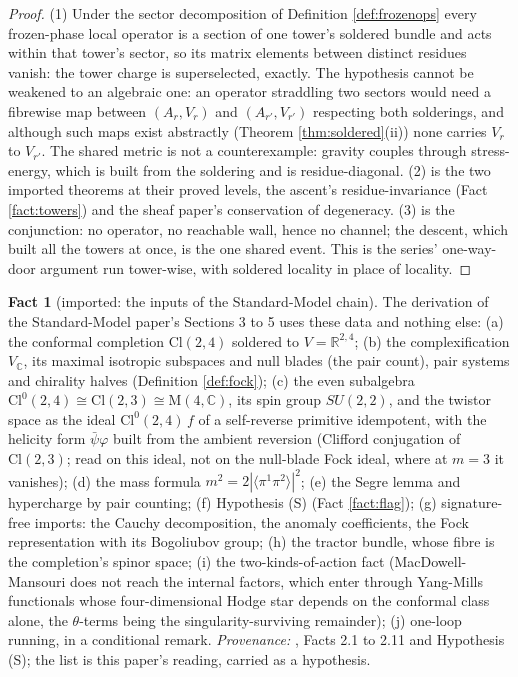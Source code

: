\documentclass[11pt]{article}
\theoremstyle{definition}
\newtheorem{fact}[theorem]{Fact}
\newcommand{\Cl}{\mathrm{Cl}}
\newcommand{\R}{\mathbb{R}}
\newcommand{\C}{\mathbb{C}}
\newcommand{\Mat}{\mathrm{M}}
\newcommand{\br}[1]{\langle #1\rangle}
\begin{document}
\begin{proof}
(1) Under the sector decomposition of Definition \ref{def:frozenops} every frozen-phase local operator is a section of one tower's soldered bundle and acts within that tower's sector, so its matrix elements between distinct residues vanish: the tower charge is superselected, exactly. The hypothesis cannot be weakened to an algebraic one: an operator straddling two sectors would need a fibrewise map between $(A_{r}, V_{r})$ and $(A_{r'}, V_{r'})$ respecting both solderings, and although such maps exist abstractly (Theorem \ref{thm:soldered}(ii)) none carries $V_{r}$ to $V_{r'}$. The shared metric is not a counterexample: gravity couples through stress-energy, which is built from the soldering and is residue-diagonal. (2) is the two imported theorems at their proved levels, the ascent's residue-invariance (Fact \ref{fact:towers}) and the sheaf paper's conservation of degeneracy. (3) is the conjunction: no operator, no reachable wall, hence no channel; the descent, which built all the towers at once, is the one shared event. This is the series' one-way-door argument run tower-wise, with soldered locality in place of locality.
\end{proof}


\begin{fact}[imported: the inputs of the Standard-Model chain]\label{fact:sminputs}
The derivation of the Standard-Model paper's Sections 3 to 5 uses these data and nothing else: (a) the conformal completion $\Cl(2,4)$ soldered to $V = \R^{2,4}$; (b) the complexification $V_{\C}$, its maximal isotropic subspaces and null blades (the pair count), pair systems and chirality halves (Definition \ref{def:fock}); (c) the even subalgebra $\Cl^{0}(2,4) \cong \Cl(2,3) \cong \Mat(4,\C)$, its spin group $SU(2,2)$, and the twistor space as the ideal $\Cl^{0}(2,4)\,f$ of a self-reverse primitive idempotent, with the helicity form $\bar{\psi}\varphi$ built from the ambient reversion (Clifford conjugation of $\Cl(2,3)$; read on this ideal, not on the null-blade Fock ideal, where at $m = 3$ it vanishes); (d) the mass formula $m^{2} = 2|\br{\pi^{1}\pi^{2}}|^{2}$; (e) the Segre lemma and hypercharge by pair counting; (f) Hypothesis (S) (Fact \ref{fact:flag}); (g) signature-free imports: the Cauchy decomposition, the anomaly coefficients, the Fock representation with its Bogoliubov group; (h) the tractor bundle, whose fibre is the completion's spinor space; (i) the two-kinds-of-action fact (MacDowell-Mansouri does not reach the internal factors, which enter through Yang-Mills functionals whose four-dimensional Hodge star depends on the conformal class alone, the $\theta$-terms being the singularity-surviving remainder); (j) one-loop running, in a conditional remark. \emph{Provenance:} \cite[\S\S2-5]{ButlerT12}, Facts 2.1 to 2.11 and Hypothesis (S); the list is this paper's reading, carried as a hypothesis.
\end{fact}
\end{document}
